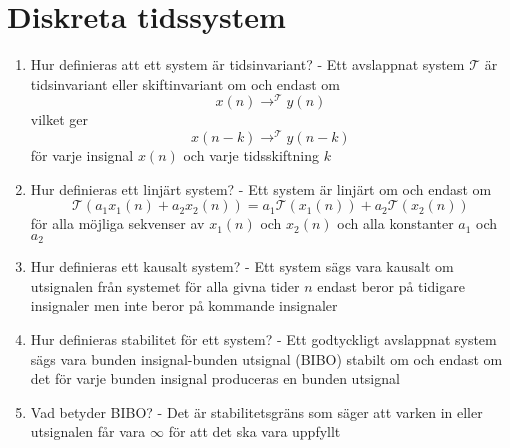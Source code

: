 \documentclass[11pt]{report}
\begin{document}
\section{Diskreta tidssystem}
\begin{enumerate}
	\item Hur definieras att ett system är tidsinvariant? - Ett avslappnat system $\mathcal{T}$ är tidsinvariant eller skiftinvariant om och endast om \[ x(n) \longrightarrow^{\mathcal{T}} y(n)  \] vilket ger \[ x(n-k) \longrightarrow^{\mathcal{T}} y(n-k)\] för varje insignal $x(n)$ och varje tidsskiftning $k$
	\item Hur definieras ett linjärt system? - Ett system är linjärt om och endast om \[ \mathcal{T}(a_1x_1(n)+a_2x_2(n)) = a_1\mathcal{T}(x_1(n)) + a_2 \mathcal{T}(x_2(n)) \]för alla möjliga sekvenser av $x_1(n)$ och $x_2(n)$ och alla konstanter $a_1$ och $a_2$
	\item Hur definieras ett kausalt system? - Ett system sägs vara kausalt om utsignalen från systemet för alla givna tider $n$ endast beror på tidigare insignaler men inte beror på kommande insignaler 
	\item Hur definieras stabilitet för ett system? - Ett godtyckligt avslappnat system sägs vara bunden insignal-bunden utsignal (BIBO) stabilt om och endast om det för varje bunden insignal produceras en bunden utsignal 
	\item Vad betyder BIBO? - Det är stabilitetsgräns som säger att varken in eller utsignalen får vara $\infty$ för att det ska vara uppfyllt 
\end{enumerate}
\end{document}
